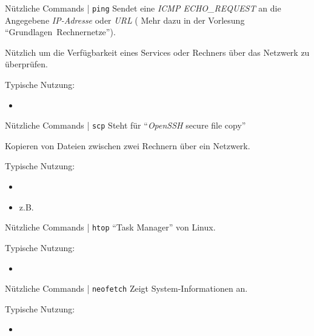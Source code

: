 \documentclass{setbeamer}
\begin{document}
\begin{frame}{Nützliche Commands | \texttt{ping}}
    Sendet eine \emph{ICMP ECHO\_REQUEST} an die Angegebene \emph{IP-Adresse} oder \emph{URL} ({\Large \MVRightarrow} Mehr dazu in der Vorlesung ``Grundlagen~Rechnernetze'').

    \vspace{0.3cm}

    Nützlich um die Verfügbarkeit eines Services oder Rechners über das Netzwerk zu überprüfen.

    \vspace{0.3cm}

    Typische Nutzung:
    \begin{itemize}
        \item {}
    \end{itemize}
\end{frame}

\begin{frame}{Nützliche Commands | \texttt{scp}}
    Steht für ``\emph{OpenSSH} secure file copy''

    \vspace{0.3cm}

    Kopieren von Dateien zwischen zwei Rechnern über ein Netzwerk.

    \vspace{0.3cm}

    Typische Nutzung:
    \begin{itemize}
        \item {}
        \item z.B. 
    \end{itemize}
\end{frame}

\begin{frame}{Nützliche Commands | \texttt{htop}}
    ``Task Manager'' von Linux.

    \vspace{0.3cm}

    Typische Nutzung:
    \begin{itemize}
        \item {}
    \end{itemize}
\end{frame}

\begin{frame}{Nützliche Commands | \texttt{neofetch}}
    Zeigt System-Informationen an.

    \vspace{0.3cm}

    Typische Nutzung:
    \begin{itemize}
        \item {}
    \end{itemize}
\end{frame}
\end{document}
